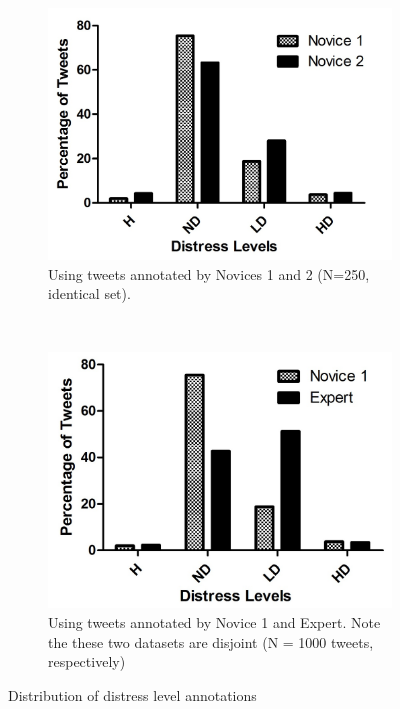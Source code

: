 \begin{figure}
        \centering
        \begin{subfigure}[b]{0.4\textwidth}
               \includegraphics[width=\textwidth]{ChrisCissi4cat.jpg}
                \caption{Using tweets annotated by Novices 1 and 2 (N=250, identical set).}
                \label{fig:gull}
        \end{subfigure}%
        ~ %
        \begin{subfigure}[b]{0.4\textwidth}
                \includegraphics[width=\textwidth]{ChrisMegan4Cat.jpg}
                \caption{Using tweets annotated by Novice 1 and Expert. Note the these two datasets are disjoint (N = 1000 tweets, respectively)}
                \label{fig:tiger}
        \end{subfigure}     
\caption{Distribution of distress level annotations}
\label{fig:distributions}
\end{figure}




